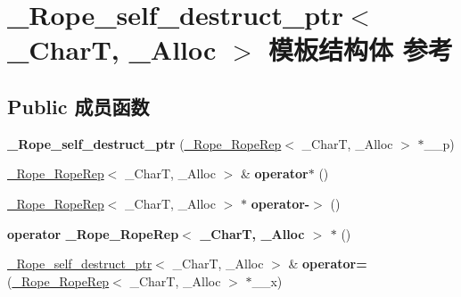 \hypertarget{struct___rope__self__destruct__ptr}{}\section{\+\_\+\+Rope\+\_\+self\+\_\+destruct\+\_\+ptr$<$ \+\_\+\+CharT, \+\_\+\+Alloc $>$ 模板结构体 参考}
\label{struct___rope__self__destruct__ptr}
\subsection*{Public 成员函数}
\begin{DoxyCompactItemize}
\item 
\mbox{\label{struct___rope__self__destruct__ptr_a02fe03f2f08cbfcaa8046e63be840a22}} 
{\bfseries \+\_\+\+Rope\+\_\+self\+\_\+destruct\+\_\+ptr} (\hyperlink{struct___rope___rope_rep}{\+\_\+\+Rope\+\_\+\+Rope\+Rep}$<$ \+\_\+\+CharT, \+\_\+\+Alloc $>$ $\ast$\+\_\+\+\_\+p)
\item 
\mbox{\label{struct___rope__self__destruct__ptr_a3773ae8998974707c77cc74105ae3b0e}} 
\hyperlink{struct___rope___rope_rep}{\+\_\+\+Rope\+\_\+\+Rope\+Rep}$<$ \+\_\+\+CharT, \+\_\+\+Alloc $>$ \& {\bfseries operator$\ast$} ()
\item 
\mbox{\label{struct___rope__self__destruct__ptr_a62486fe489547821a5fdbb65ffe38d12}} 
\hyperlink{struct___rope___rope_rep}{\+\_\+\+Rope\+\_\+\+Rope\+Rep}$<$ \+\_\+\+CharT, \+\_\+\+Alloc $>$ $\ast$ {\bfseries operator-\/$>$} ()
\item 
\mbox{\label{struct___rope__self__destruct__ptr_a57aac8160070be7f3c6ed4cf9ab659ed}} 
{\bfseries operator \+\_\+\+Rope\+\_\+\+Rope\+Rep$<$ \+\_\+\+Char\+T, \+\_\+\+Alloc $>$ $\ast$} ()
\item 
\mbox{\label{struct___rope__self__destruct__ptr_ae17c4936bf001ed2ccfb84a6df7a54b2}} 
\hyperlink{struct___rope__self__destruct__ptr}{\+\_\+\+Rope\+\_\+self\+\_\+destruct\+\_\+ptr}$<$ \+\_\+\+CharT, \+\_\+\+Alloc $>$ \& {\bfseries operator=} (\hyperlink{struct___rope___rope_rep}{\+\_\+\+Rope\+\_\+\+Rope\+Rep}$<$ \+\_\+\+CharT, \+\_\+\+Alloc $>$ $\ast$\+\_\+\+\_\+x)
\end{DoxyCompactItemize}
